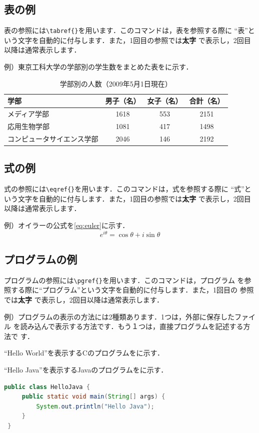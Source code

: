 \subsection{表の例}
表の参照には\verb|\tabref{}|を用います．このコマンドは，表を参照する際に
``表''という文字を自動的に付与します．また，1回目の参照では\textbf{太字}
で表示し，2回目以降は通常表示します．

例）東京工科大学の学部別の学生数をまとめた表をに示す．
\begin{table}[tb]
 \begin{center}
  \caption{学部別の人数（2009年5月1日現在）} \label{tab:teu}
  \begin{tabular}{l|c|c|c}\hline\hline
   学部 & 男子（名） & 女子（名） & 合計（名）\\\hline
   メディア学部 & 1618 & 553 & 2151\\
   応用生物学部 & 1081 & 417 & 1498\\
   コンピュータサイエンス学部 & 2046 & 146 & 2192\\ \hline
  \end{tabular}
 \end{center}
\end{table}

\subsection{式の例}
式の参照には\verb|\eqref{}|を用います．このコマンドは，式を参照する際に
``式''という文字を自動的に付与します．また，1回目の参照では\textbf{太字}
で表示し，2回目以降は通常表示します．

例）オイラーの公式を\eqref{eq:euler}に示す．
\begin{equation}
 e^{i\theta} = \cos\theta + i \sin\theta\label{eq:euler}
\end{equation}

\subsection{プログラムの例}
プログラムの参照には\verb|\pgref{}|を用います．このコマンドは，プログラム
を参照する際に``プログラム''という文字を自動的に付与します．また，1回目の
参照では\textbf{太字} で表示し，2回目以降は通常表示します．

例）プログラムの表示の方法には2種類あります．1つは，外部に保存したファイル
を読み込んで表示する方法です．もう１つは，直接プログラムを記述する方法で
す．

``Hello World''を表示するCのプログラムをに示す．


``Hello Java''を表示するJavaのプログラムをに示す．
\begin{lstlisting}[caption=Hello Java, label=pg:hellojava,language=java]
 public class HelloJava {
     public static void main(String[] args) {
         System.out.println("Hello Java");
     }
 }
\end{lstlisting}
